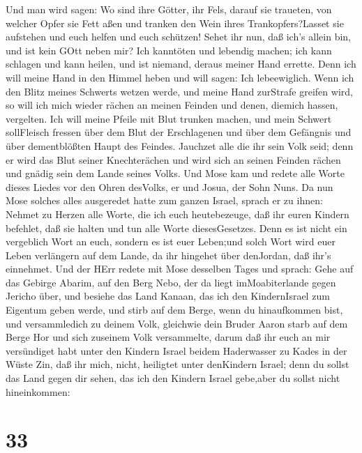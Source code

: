  Und man wird sagen: Wo sind ihre Götter, ihr Fels, darauf
sie traueten,  von welcher Opfer sie Fett aßen und tranken
den Wein ihres Trankopfers?Lasset sie aufstehen und euch helfen und euch
schützen!  Sehet ihr nun, daß ich's allein bin, und ist
kein GOtt neben mir? Ich kanntöten und lebendig machen; ich kann
schlagen und kann heilen, und ist niemand, deraus meiner Hand errette.
 Denn ich will meine Hand in den Himmel heben und will
sagen: Ich lebeewiglich.  Wenn ich den Blitz meines
Schwerts wetzen werde, und meine Hand zurStrafe greifen wird, so will
ich mich wieder rächen an meinen Feinden und denen, diemich hassen,
vergelten.  Ich will meine Pfeile mit Blut trunken machen,
und mein Schwert sollFleisch fressen über dem Blut der Erschlagenen und
über dem Gefängnis und über dementblößten Haupt des Feindes.
 Jauchzet alle die ihr sein Volk seid; denn er wird das
Blut seiner Knechterächen und wird sich an seinen Feinden rächen und
gnädig sein dem Lande seines Volks.  Und Mose kam und
redete alle Worte dieses Liedes vor den Ohren desVolks, er und Josua,
der Sohn Nuns.  Da nun Mose solches alles ausgeredet hatte
zum ganzen Israel,  sprach er zu ihnen: Nehmet zu Herzen
alle Worte, die ich euch heutebezeuge, daß ihr euren Kindern befehlet,
daß sie halten und tun alle Worte diesesGesetzes.  Denn es
ist nicht ein vergeblich Wort an euch, sondern es ist euer Leben;und
solch Wort wird euer Leben verlängern auf dem Lande, da ihr hingehet
über denJordan, daß ihr's einnehmet.  Und der HErr redete
mit Mose desselben Tages und sprach:  Gehe auf das Gebirge
Abarim, auf den Berg Nebo, der da liegt imMoabiterlande gegen Jericho
über, und besiehe das Land Kanaan, das ich den KindernIsrael zum
Eigentum geben werde,  und stirb auf dem Berge, wenn du
hinaufkommen bist, und versammledich zu deinem Volk, gleichwie dein
Bruder Aaron starb auf dem Berge Hor und sich zuseinem Volk versammelte,
 darum daß ihr euch an mir versündiget habt unter den
Kindern Israel beidem Haderwasser zu Kades in der Wüste Zin, daß ihr
mich, nicht, heiligtet unter denKindern Israel;  denn du
sollst das Land gegen dir sehen, das ich den Kindern Israel gebe,aber du
sollst nicht hineinkommen:

\hypertarget{section-32}{%
\section{33}\label{section-32}}

